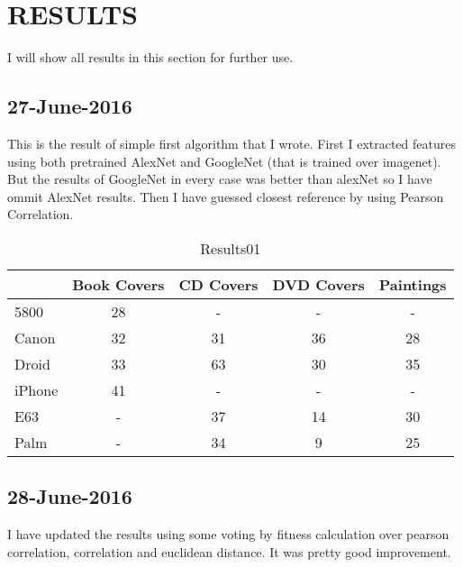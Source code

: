 \chapter{RESULTS}\label{ch:results}
I will show all results in this section for further use.

\section{27-June-2016}
This is the result of simple first algorithm that I wrote. First I extracted features using both pretrained AlexNet and GoogleNet (that is trained over imagenet). But the results of GoogleNet in every case was better than alexNet so I have ommit AlexNet results. Then I have guessed closest reference by using Pearson Correlation.

\begin{table*}
{\setlength{\tabcolsep}{14pt}
\caption{Results01}
\begin{center}
  \begin{tabular}{ |l | c | c | c | c | }
    \hline
    		   &Book Covers & CD Covers & DVD Covers & Paintings \\ \hline 
    5800   & 28         & -         & -          & -         \\ \hline 
    Canon  & 32         & 31        & 36         & 28        \\ \hline 
    Droid  & 33         & 63        & 30         & 35        \\ \hline 
    iPhone & 41         & -         & -          & -         \\ \hline 
    E63    & -          & 37	       & 14         & 30        \\ \hline 
    Palm   & -          & 34        & 9          & 25        \\ \hline

  \end{tabular}
\end{center}
\label{results01}}
\end{table*}



\section{28-June-2016}
I have updated the results using some voting by fitness calculation over pearson correlation, correlation and euclidean distance. It was pretty good improvement.

